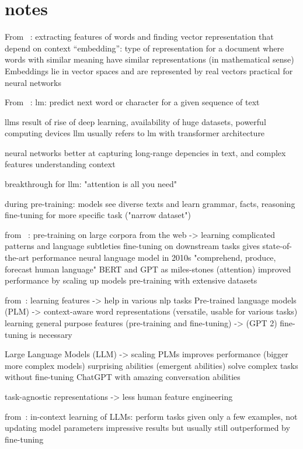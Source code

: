 \section{notes}

From ~\autocite{quadarLM2020}:
extracting features of words and finding vector representation that depend on context
\enquote{embedding}: type of representation for a document where words with similar meaning have similar representations (in mathematical sense)
Embeddings lie in vector spaces and are represented by real vectors
practical for neural networks

From ~\autocite{Hadi_2023}:
\gls{lm}: predict next word or character for a given sequence of text

\gls{llm}s result of rise of deep learning, availability of huge datasets, powerful computing devices
\gls{llm} usually refers to lm with transformer architecture

neural networks better at capturing long-range depencies in text, and complex features
understanding context

breakthrough for llm: "attention is all you need"

during pre-training: models see diverse texts and learn grammar, facts, reasoning
fine-tuning for more specific task ("narrow dataset")

from ~\autocite{Raiaan2024ARO}:
pre-training on large corpora from the web -> learning complicated patterns and language subtleties
fine-tuning on downstream tasks gives state-of-the-art performance
neural language model in 2010s
"comprehend, produce, forecast human language"
BERT and GPT as miles-stones (attention)
improved performance by scaling up models
pre-training with extensive datasets

from~\autocite{zhao2023survey}:
learning features -> help in various nlp tasks
Pre-trained language models (PLM) -> context-aware word representations (versatile, usable for various tasks)
learning general purpose features (pre-training and fine-tuning) -> (GPT 2)
fine-tuning is necessary

Large Language Models (LLM) -> scaling PLMs improves performance (bigger more complex models)
surprising abilities (emergent abilities)
solve complex tasks without fine-tuning
ChatGPT with amazing conversation abilities

task-agnostic representations -> less human feature engineering

from~\autocite{bhatia2023tart}:
in-context learning of LLMs: perform tasks given only a few examples, not updating model parameters
impressive results but usually still outperformed by fine-tuning

